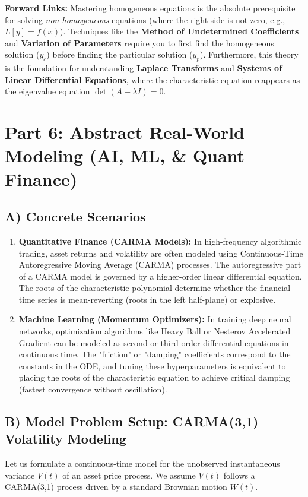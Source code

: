 \documentclass[11pt, a4paper]{article}
\theoremstyle{definition}
\theoremstyle{remark}
\begin{document}
\textbf{Forward Links:} Mastering homogeneous equations is the absolute prerequisite for solving \textit{non-homogeneous} equations (where the right side is not zero, e.g., $L[y] = f(x)$). Techniques like the \textbf{Method of Undetermined Coefficients} and \textbf{Variation of Parameters} require you to first find the homogeneous solution ($y_c$) before finding the particular solution ($y_p$). Furthermore, this theory is the foundation for understanding \textbf{Laplace Transforms} and \textbf{Systems of Linear Differential Equations}, where the characteristic equation reappears as the eigenvalue equation $\det(A - \lambda I) = 0$.

\newpage
\section{Part 6: Abstract Real-World Modeling (AI, ML, \& Quant Finance)}

\subsection{A) Concrete Scenarios}
\begin{enumerate}
    \item \textbf{Quantitative Finance (CARMA Models):} In high-frequency algorithmic trading, asset returns and volatility are often modeled using Continuous-Time Autoregressive Moving Average (CARMA) processes. The autoregressive part of a CARMA model is governed by a higher-order linear differential equation. The roots of the characteristic polynomial determine whether the financial time series is mean-reverting (roots in the left half-plane) or explosive.
    \item \textbf{Machine Learning (Momentum Optimizers):} In training deep neural networks, optimization algorithms like Heavy Ball or Nesterov Accelerated Gradient can be modeled as second or third-order differential equations in continuous time. The "friction" or "damping" coefficients correspond to the constants in the ODE, and tuning these hyperparameters is equivalent to placing the roots of the characteristic equation to achieve critical damping (fastest convergence without oscillation).
\end{enumerate}

\subsection{B) Model Problem Setup: CARMA(3,1) Volatility Modeling}
Let us formulate a continuous-time model for the unobserved instantaneous variance $V(t)$ of an asset price process. We assume $V(t)$ follows a CARMA(3,1) process driven by a standard Brownian motion $W(t)$.
\end{document}
